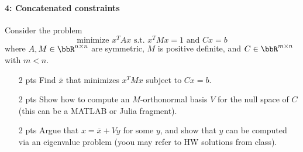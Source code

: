 \documentclass[12pt, leqno]{article} %
\begin{document}
\paragraph*{4: Concatenated constraints}
Consider the problem
\[
  \mbox{minimize } x^T A x \mbox{ s.t. } x^T M x = 1 \mbox{ and } Cx = b
\]
where $A, M \in \bbR^{n \times n}$ are symmetric, $M$ is positive definite, and $C \in
\bbR^{m \times n}$ with $m < n$.
\begin{itemize}
\item[2 pts] Find $\bar{x}$ that minimizes $x^T M x$ subject to $Cx = b$.
\item[2 pts] Show how to compute an $M$-orthonormal basis $V$ for the 
  null space of $C$ (this can be a MATLAB or Julia fragment).
\item[2 pts] Argue that $x = \bar{x} + Vy$ for some $y$,
  and show that $y$ can be computed via an eigenvalue problem
  (yoou may refer to HW solutions from class).
\end{itemize}
\end{document}
